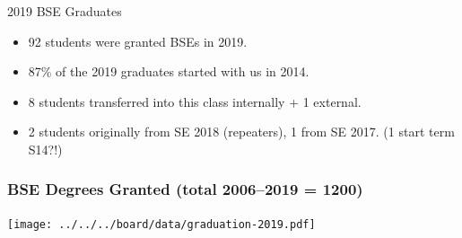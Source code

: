 \documentclass{beamer}
\begin{document}
\begin{frame}{2019 BSE Graduates}
  \large
  \begin{itemize}
  \item 92 students were granted BSEs in 2019.
  \item 87\% of the 2019 graduates started with us in 2014.
  \item 8 students transferred into this class internally + 1 external.
  \item 2 students originally from SE 2018 (repeaters), 1 from SE 2017. (1 start term S14?!)
  \end{itemize}
\end{frame}

\begin{frame}
  \frametitle{BSE Degrees Granted (total 2006--2019 = 1200)}
  \texttt{[image: ../../../board/data/graduation-2019.pdf]}
\end{frame}
\end{document}
